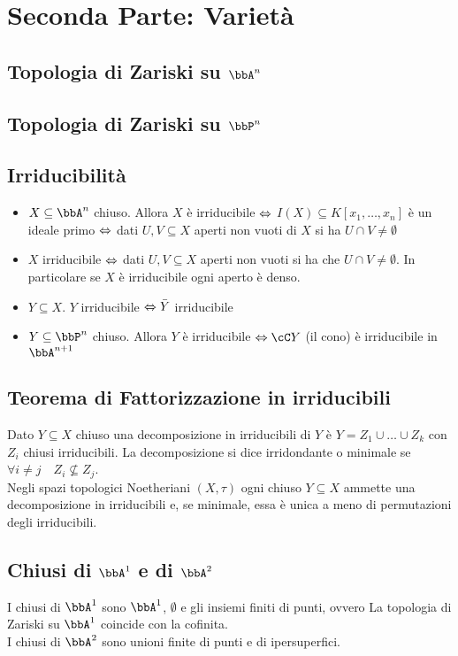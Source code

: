 \documentclass[a4paper,NoNotes,GeneralMath]{stdmdoc}
\begin{document}
	\section*{Seconda Parte: Varietà}
	\subsection*{Topologia di Zariski su $\bbA^n$}
	
	\subsection*{Topologia di Zariski su $\bbP^n$}
	
	\subsection*{Irriducibilità}
	\begin{itemize}
		\item $X \subseteq \bbA^n$ chiuso. Allora $X$ è irriducibile $\Leftrightarrow$ $I(X) \subseteq K[x_1, \ldots, x_n]$ è un ideale primo $\Leftrightarrow$ dati $U, V \subseteq X$ aperti non vuoti di $X$ si ha $U \cap V \neq \emptyset$
		\item $X$ irriducibile $\Leftrightarrow$ dati $U, V \subseteq X$ aperti non vuoti si ha che $U \cap V \neq \emptyset$. In particolare se $X$ è irriducibile ogni aperto è denso.
		\item $Y \subseteq X$. $Y$ irriducibile $\Leftrightarrow \bar{Y}$ irriducibile
		\item $Y \subseteq \bbP^n$ chiuso. Allora $Y$ è irriducibile $\sse \cC Y$ (il cono) è irriducibile in $\bbA^{n+1}$
	\end{itemize}
	
	\subsection*{Teorema di Fattorizzazione in irriducibili}
	Dato $Y \subseteq X$ chiuso una decomposizione in irriducibili di $Y$ è $Y = Z_1 \cup \ldots \cup Z_k$ con $Z_i$ chiusi irriducibili. La decomposizione si dice irridondante o minimale se $\forall i \neq j \quad Z_i \not\subseteq Z_j$. \\
	Negli spazi topologici Noetheriani $(X, \tau)$ ogni chiuso $Y \subseteq X$ ammette una decomposizione in irriducibili e, se minimale, essa è unica a meno di permutazioni degli irriducibili.
	
	\subsection*{Chiusi di $\bbA^1$ e di $\bbA^2$}
	I chiusi di $\bbA^1$ sono $\bbA^1$, $\emptyset$ e gli insiemi finiti di punti, ovvero La topologia di Zariski su $\bbA^1$ coincide con la cofinita. \\
	I chiusi di $\bbA^2$ sono unioni finite di punti e di ipersuperfici.
	
\end{document}
